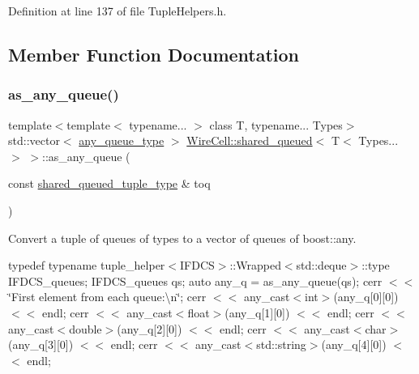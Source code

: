 Definition at line 137 of file Tuple\+Helpers.\+h.



\subsection{Member Function Documentation}
\mbox{\label{struct_wire_cell_1_1shared__queued_3_01_t_3_01_types_8_8_8_01_4_01_4_aff51f08da8659b24a7976cf41208188b}} 
\subsubsection{\texorpdfstring{as\+\_\+any\+\_\+queue()}{as\_any\_queue()}}
{\footnotesize\ttfamily template$<$template$<$ typename... $>$ class T, typename... Types$>$ \\
std\+::vector$<$ \hyperlink{struct_wire_cell_1_1shared__queued_3_01_t_3_01_types_8_8_8_01_4_01_4_a8ff8e1f0ff23fd750a91eeb2d4952bb0}{any\+\_\+queue\+\_\+type} $>$ \hyperlink{struct_wire_cell_1_1shared__queued}{Wire\+Cell\+::shared\+\_\+queued}$<$ T$<$ Types... $>$ $>$\+::as\+\_\+any\+\_\+queue (\begin{DoxyParamCaption}\item[{const \hyperlink{struct_wire_cell_1_1shared__queued_3_01_t_3_01_types_8_8_8_01_4_01_4_ab8420ec9cbc02f0d73f0e7521a063cb0}{shared\+\_\+queued\+\_\+tuple\+\_\+type} \&}]{toq }\end{DoxyParamCaption})\hspace{0.3cm}{\ttfamily [inline]}}

Convert a tuple of queues of types to a vector of queues of boost\+::any.

typedef typename tuple\+\_\+helper$<$\+I\+F\+D\+C\+S$>$\+::\+Wrapped$<$std\+::deque$>$\+::type I\+F\+D\+C\+S\+\_\+queues; I\+F\+D\+C\+S\+\_\+queues qs; auto any\+\_\+q = as\+\_\+any\+\_\+queue(qs); cerr $<$$<$ \char`\"{}\+First element from each queue\+:\textbackslash{}n\char`\"{}; cerr $<$$<$ any\+\_\+cast$<$int$>$(any\+\_\+q\mbox{[}0\mbox{]}\mbox{[}0\mbox{]}) $<$$<$ endl; cerr $<$$<$ any\+\_\+cast$<$float$>$(any\+\_\+q\mbox{[}1\mbox{]}\mbox{[}0\mbox{]}) $<$$<$ endl; cerr $<$$<$ any\+\_\+cast$<$double$>$(any\+\_\+q\mbox{[}2\mbox{]}\mbox{[}0\mbox{]}) $<$$<$ endl; cerr $<$$<$ any\+\_\+cast$<$char$>$(any\+\_\+q\mbox{[}3\mbox{]}\mbox{[}0\mbox{]}) $<$$<$ endl; cerr $<$$<$ any\+\_\+cast$<$std\+::string$>$(any\+\_\+q\mbox{[}4\mbox{]}\mbox{[}0\mbox{]}) $<$$<$ endl; 


